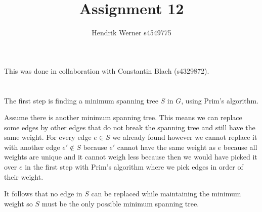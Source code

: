 \documentclass[12pt, a4paper]{article}
\title{Assignment 12}
\author{Hendrik Werner s4549775}
\begin{document}
\maketitle

This was done in collaboration with Constantin Blach (s4329872).

\section{} %

\section{} %

\section{} %

\section{} %

\section{} %

The first step is finding a minimum spanning tree $S$ in $G$, using Prim's algorithm.

Assume there is another minimum spanning tree. This means we can replace some edges by other edges that do not break the spanning tree and still have the same weight. For every edge $e \in S$ we already found however we cannot replace it with another edge $e' \not\in S$ because $e'$ cannot have the same weight as $e$ because all weights are unique and it cannot weigh less because then we would have picked it over $e$ in the first step with Prim's algorithm where we pick edges in order of their weight.

It follows that no edge in $S$ can be replaced while maintaining the minimum weight so $S$ must be the only possible minimum spanning tree.
\end{document}
